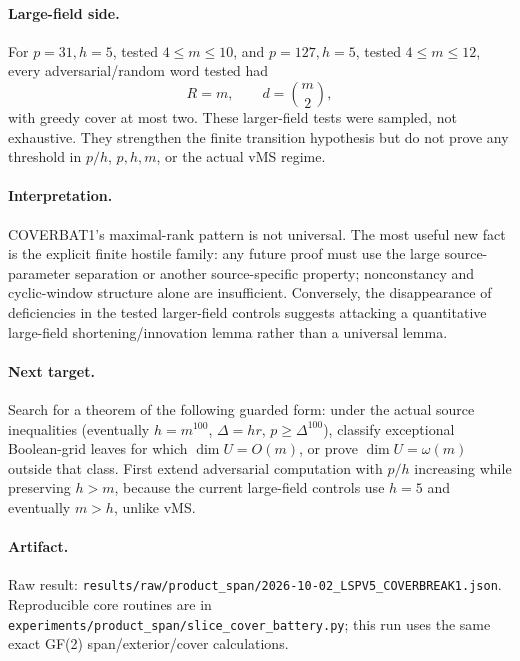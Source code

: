 \documentclass[11pt]{article}\usepackage[margin=.88in]{geometry}\usepackage{amsmath,amssymb}
\begin{document}
\paragraph{Large-field side.}
For \(p=31,h=5\), tested \(4\le m\le10\), and \(p=127,h=5\), tested \(4\le m\le12\), every adversarial/random word tested had
\[
R=m,\qquad d=\binom m2,
\]
with greedy cover at most two. These larger-field tests were sampled, not exhaustive. They strengthen the finite transition hypothesis but do not prove any threshold in \(p/h\), \(p,h,m\), or the actual vMS regime.

\paragraph{Interpretation.}
COVERBAT1's maximal-rank pattern is not universal. The most useful new fact is the explicit finite hostile family: any future proof must use the large source-parameter separation or another source-specific property; nonconstancy and cyclic-window structure alone are insufficient. Conversely, the disappearance of deficiencies in the tested larger-field controls suggests attacking a quantitative large-field shortening/innovation lemma rather than a universal lemma.

\paragraph{Next target.}
Search for a theorem of the following guarded form: under the actual source inequalities (eventually \(h=m^{100}\), \(\Delta=hr\), \(p\ge\Delta^{100}\)), classify exceptional Boolean-grid leaves for which \(\dim U=O(m)\), or prove \(\dim U=\omega(m)\) outside that class. First extend adversarial computation with \(p/h\) increasing while preserving \(h>m\), because the current large-field controls use \(h=5\) and eventually \(m>h\), unlike vMS.

\paragraph{Artifact.}
Raw result: \texttt{results/raw/product\_span/2026-10-02\_LSPV5\_COVERBREAK1.json}. Reproducible core routines are in \texttt{experiments/product\_span/slice\_cover\_battery.py}; this run uses the same exact GF(2) span/exterior/cover calculations.
\end{document}
